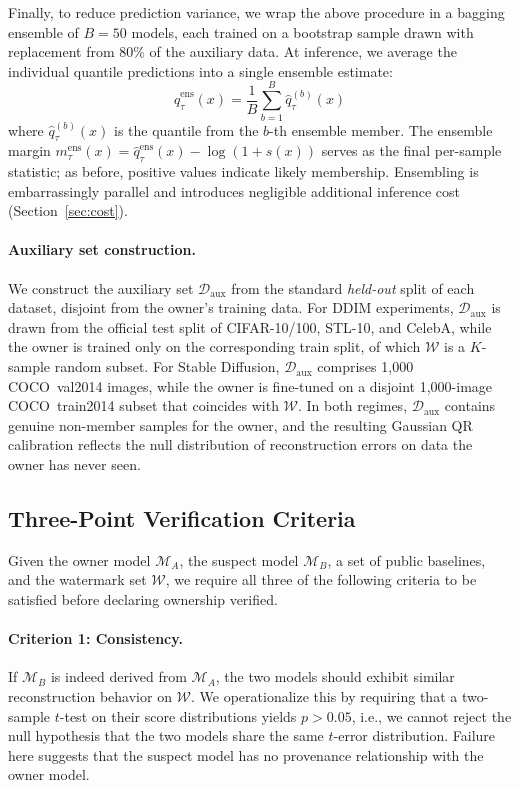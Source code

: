 \documentclass[sigconf, review, anonymous]{acmart}
\newcommand{\Wset}{\ensuremath{\mathcal{W}}\xspace}
\begin{document}
Finally, to reduce prediction variance, we wrap the above procedure in a bagging ensemble of $B{=}50$ models, each trained on a bootstrap sample drawn with replacement from 80\% of the auxiliary data. At inference, we average the individual quantile predictions into a single ensemble estimate:
\begin{equation}
\hat{q}_\tau^{\text{ens}}(x) = \frac{1}{B}\sum_{b=1}^{B}\hat{q}_\tau^{(b)}(x)
\end{equation}
where $\hat{q}_\tau^{(b)}(x)$ is the quantile from the $b$-th ensemble member. The ensemble margin $m_\tau^{\text{ens}}(x) = \hat{q}_\tau^{\text{ens}}(x) - \log(1 + s(x))$ serves as the final per-sample statistic; as before, positive values indicate likely membership. Ensembling is embarrassingly parallel and introduces negligible additional inference cost (Section~\ref{sec:cost}).

\paragraph{Auxiliary set construction.}
We construct the auxiliary set $\mathcal{D}_{\text{aux}}$ from the standard
\emph{held-out} split of each dataset, disjoint from the owner's training data.
For DDIM experiments, $\mathcal{D}_{\text{aux}}$ is drawn from the official
test split of CIFAR-10/100, STL-10, and CelebA, while the owner is trained
only on the corresponding train split, of which $\mathcal{W}$ is a $K$-sample
random subset. For Stable Diffusion, $\mathcal{D}_{\text{aux}}$ comprises
1{,}000 COCO~val2014 images, while the owner is fine-tuned on a disjoint
1{,}000-image COCO~train2014 subset that coincides with $\mathcal{W}$.
In both regimes, $\mathcal{D}_{\text{aux}}$ contains genuine non-member samples
for the owner, and the resulting Gaussian QR calibration reflects the null
distribution of reconstruction errors on data the owner has never seen.

\subsection{Three-Point Verification Criteria}
\label{sec:criteria}

Given the owner model $\mathcal{M}_A$, the suspect model $\mathcal{M}_B$, a set of public baselines, and the watermark set $\Wset$, we require all three of the following criteria to be satisfied before declaring ownership verified.

\paragraph{Criterion 1: Consistency.}
If $\mathcal{M}_B$ is indeed derived from $\mathcal{M}_A$, the two models should exhibit similar reconstruction behavior on $\Wset$. We operationalize this by requiring that a two-sample $t$-test on their score distributions yields $p > 0.05$, i.e., we cannot reject the null hypothesis that the two models share the same $t$-error distribution. Failure here suggests that the suspect model has no provenance relationship with the owner model.
\end{document}
